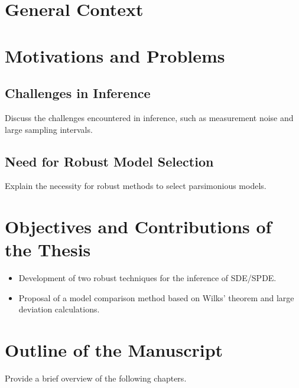 
\section{General Context}

\section{Motivations and Problems}
\subsection{Challenges in Inference}
Discuss the challenges encountered in inference, such as measurement noise and large sampling intervals.

\subsection{Need for Robust Model Selection}
Explain the necessity for robust methods to select parsimonious models.

\section{Objectives and Contributions of the Thesis}
\begin{itemize}
    \item Development of two robust techniques for the inference of SDE/SPDE.
    \item Proposal of a model comparison method based on Wilks’ theorem and large deviation calculations.
\end{itemize}

\section{Outline of the Manuscript}
Provide a brief overview of the following chapters.

